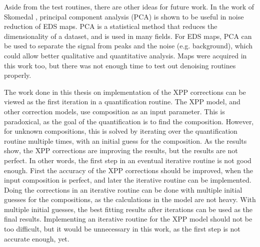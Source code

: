 Aside from the test routines, there are other ideas for future work.
In the work of Skomedal \cite{skomedal_improving_2022}, principal component analysis (PCA) is shown to be useful in noise reduction of EDS maps.
PCA is a statistical method that reduces the dimensionality of a dataset, and is used in many fields.
For EDS maps, PCA can be used to separate the signal from peaks and the noise (e.g. background), which could allow better qualitative and quantitative analysis.
Maps were acquired in this work too, but there was not enough time to test out denoising routines properly.


The work done in this thesis on implementation of the XPP corrections can be viewed as the first iteration in a quantification routine.
The XPP model, and other correction models, use composition as an input parameter.
This is paradoxical, as the goal of the quantification is to find the composition.
However, for unknown compositions, this is solved by iterating over the quantification routine multiple times, with an initial guess for the composition.
As the results show, the XPP corrections are improving the results, but the results are not perfect.
In other words, the first step in an eventual iterative routine is not good enough.
First the accuracy of the XPP corrections should be improved, when the input composition is perfect, and later the iterative routine can be implemented.
Doing the corrections in an iterative routine can be done with multiple initial guesses for the compositions, as the calculations in the model are not heavy.
With multiple initial guesses, the best fitting results after iterations can be used as the final results.
Implementing an iterative routine for the XPP model should not be too difficult, but it would be unnecessary in this work, as the first step is not accurate enough, yet.
